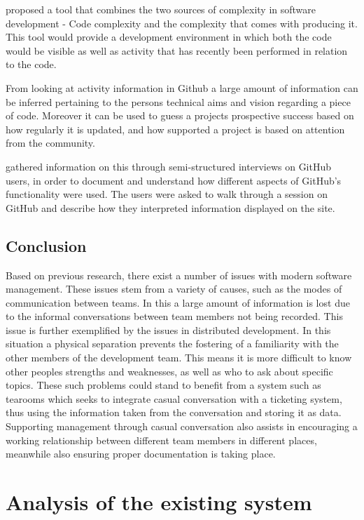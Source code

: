 \documentclass{l4proj}
\begin{document}
\citet{froehlich04unifying} proposed a tool that combines the two sources of complexity in software development - Code complexity and the complexity that comes with producing it.  This tool would provide a development environment in which both the code would be visible as well as activity that has recently been performed in relation to the code.

From looking at activity information in Github a large amount of information can be inferred pertaining to the persons technical aims and vision regarding a piece of code.  Moreover it can be used to guess a projects prospective success based on how regularly it is updated, and how supported a project is based on attention from the community.

\citet{dabbish12social} gathered information on this through semi-structured interviews on GitHub users, in order to document and understand how different aspects of GitHub's functionality were used.  The users were asked to walk through a session on GitHub and describe how they interpreted information displayed on the site.


\section{Conclusion}

Based on previous research, there exist a number of issues with modern software management.  These issues stem from a variety of causes, such as the modes of communication between teams.  In this a large amount of information is lost due to the informal conversations between team members not being recorded.  This issue is further exemplified by the issues in distributed development.  In this situation a physical separation prevents the fostering of a familiarity with the other members of the development team.  This means it is more difficult to know other peoples strengths and weaknesses, as well as who to ask about specific topics. These such problems could stand to benefit from a system such as tearooms which seeks to integrate casual conversation with a ticketing system, thus using the information taken from the conversation and storing it as data.  Supporting management through casual conversation also assists in encouraging a working relationship between different team members in different places, meanwhile also ensuring proper documentation is taking place.

\chapter{Analysis of the existing system}
\end{document}
